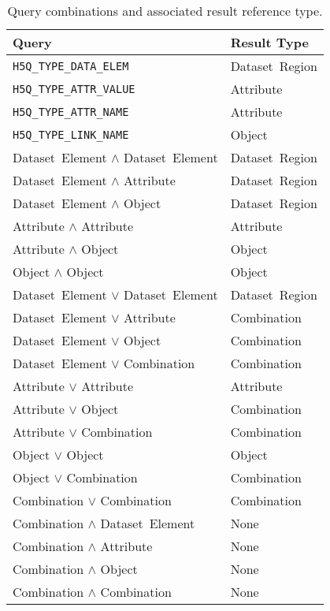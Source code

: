 \begin{table}[ht]\footnotesize
\caption{Query combinations and associated result reference type.}
\label{tab:querycomb}
\begin{tabular}{ll} \toprule
Query &
Result Type\\ \midrule
\texttt{H5Q\_TYPE\_DATA\_ELEM} & Dataset~Region \\
\texttt{H5Q\_TYPE\_ATTR\_VALUE} & Attribute \\
\texttt{H5Q\_TYPE\_ATTR\_NAME} & Attribute \\
\texttt{H5Q\_TYPE\_LINK\_NAME} & Object \\
Dataset~Element $\mathrm{\land}$ Dataset~Element & Dataset~Region \\
Dataset~Element $\mathrm{\land}$ Attribute & Dataset~Region \\
Dataset~Element $\mathrm{\land}$ Object & Dataset~Region \\
Attribute $\mathrm{\land}$ Attribute & Attribute \\
Attribute $\mathrm{\land}$ Object & Object \\
Object $\mathrm{\land}$ Object & Object \\
Dataset~Element $\mathrm{\lor}$ Dataset~Element & Dataset~Region \\
Dataset~Element $\mathrm{\lor}$ Attribute & Combination \\
Dataset~Element $\mathrm{\lor}$ Object & Combination \\
Dataset~Element $\mathrm{\lor}$ Combination & Combination \\
Attribute $\mathrm{\lor}$ Attribute & Attribute \\
Attribute $\mathrm{\lor}$ Object & Combination \\
Attribute $\mathrm{\lor}$ Combination & Combination \\
Object $\mathrm{\lor}$ Object & Object \\
Object $\mathrm{\lor}$ Combination & Combination \\
Combination $\mathrm{\lor}$ Combination & Combination \\
Combination $\mathrm{\land}$ Dataset~Element & None \\
Combination $\mathrm{\land}$ Attribute & None \\
Combination $\mathrm{\land}$ Object & None \\
Combination $\mathrm{\land}$ Combination & None \\
\bottomrule
\end{tabular}
\end{table}

